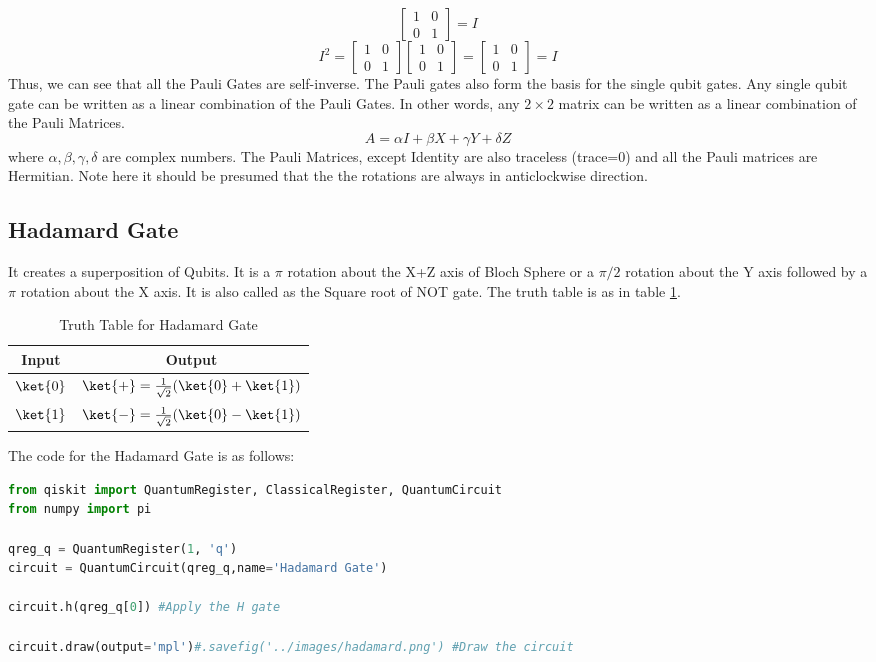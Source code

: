 \documentclass[12pt, oneside]{book}
\theoremstyle{definition}
\theoremstyle{definition}
\theoremstyle{remark}
\begin{document}
\begin{importantnote}
\[\begin{bmatrix}
        1 & 0 \\
        0 & 1
    \end{bmatrix}=I
\]
\[
    I^2=\begin{bmatrix}
        1 & 0 \\
        0 & 1
    \end{bmatrix}\begin{bmatrix}
        1 & 0 \\
        0 & 1
    \end{bmatrix}=\begin{bmatrix}
        1 & 0 \\
        0 & 1
    \end{bmatrix}=I
\]
Thus, we can see that all the Pauli Gates are self-inverse.
The Pauli gates also form the basis for the single qubit gates. Any single qubit gate can be written as a linear combination of the Pauli Gates.
In other words, any $2 \times 2$ matrix can be written as a linear combination of the Pauli Matrices.
\[
    A=\alpha I+\beta X+\gamma Y+\delta Z
\]
where $\alpha,\beta,\gamma,\delta$ are complex numbers. The Pauli Matrices, except Identity are also traceless (trace=0) and all the Pauli matrices are Hermitian.
Note here it should be presumed that the the rotations are always in anticlockwise direction.
\end{importantnote}

\subsection{Hadamard Gate}\label{qgate:hadamard}
It creates a superposition of Qubits. 
It is a $\pi$ rotation about the X+Z axis of Bloch Sphere or 
a $\pi/2$ rotation about the Y axis followed by a $\pi$ rotation about the X axis.
It is also called as the Square root of NOT gate. The truth table is as in table \ref{tab:hadamard}.
\begin{table}[H]
    \centering
    \begin{tabular}{|c|c|}
        \hline
        Input & Output\\
        \hline
        $\ket{0}$ & $\ket{+}=\frac{1}{\sqrt{2}}(\ket{0}+\ket{1})$\\
        $\ket{1}$ & $\ket{-}=\frac{1}{\sqrt{2}}(\ket{0}-\ket{1})$\\
        \hline
    \end{tabular}
    \caption{Truth Table for Hadamard Gate}
    \label{tab:hadamard}
\end{table}

The code for the Hadamard Gate is as follows:
\begin{lstlisting}[language=Python]
from qiskit import QuantumRegister, ClassicalRegister, QuantumCircuit
from numpy import pi

qreg_q = QuantumRegister(1, 'q')
circuit = QuantumCircuit(qreg_q,name='Hadamard Gate')

circuit.h(qreg_q[0]) #Apply the H gate

circuit.draw(output='mpl')#.savefig('../images/hadamard.png') #Draw the circuit
\end{lstlisting}
\end{document}
